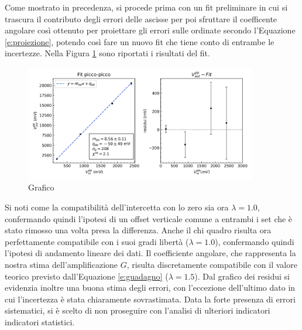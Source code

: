 \documentclass[a4paper,11pt]{article}
\begin{document}
\noindent Come mostrato in precedenza, si procede prima con un fit
preliminare in cui si trascura il contributo degli errori delle ascisse per poi
sfruttare il coefficente angolare così ottenuto per proiettare gli errori sulle ordinate secondo l'Equazione \ref{e:proiezione}, potendo così fare un nuovo fit che tiene conto di
entrambe le incertezze. Nella Figura \ref{fig:lin_pp} sono riportati i risultati del fit.
\begin{figure}[h]
\centering
\includegraphics[width=0.9\textwidth]{images/grafico_pp}
\caption{\footnotesize Grafico}\label{fig:lin_pp}
\end{figure}
Si noti come la compatibilità dell'intercetta con lo zero sia ora $\lambda=1.0$, confermando quindi l'ipotesi di un offset verticale comune a entrambi i set che è stato rimosso una volta
presa la differenza. Anche il chi quadro risulta ora perfettamente compatibile con i suoi
gradi libertà ($\lambda=1.0$), confermando quindi l'ipotesi di andamento lineare dei
dati. Il coefficiente angolare, che rappresenta la nostra stima dell'amplificazione $G$,
risulta discretamente compatibile con il valore teorico previsto dall'Equazione
\ref{e:guadagno} ($\lambda = 1.5$).
Dal grafico dei residui si evidenzia inoltre una buona stima degli errori, con l'eccezione
dell'ultimo dato in cui l'incertezza è stata chiaramente sovrastimata.
Data la forte presenza di errori sistematici, si è scelto di non proseguire con l'analisi di
ulteriori indicatori indicatori statistici.
\end{document}
